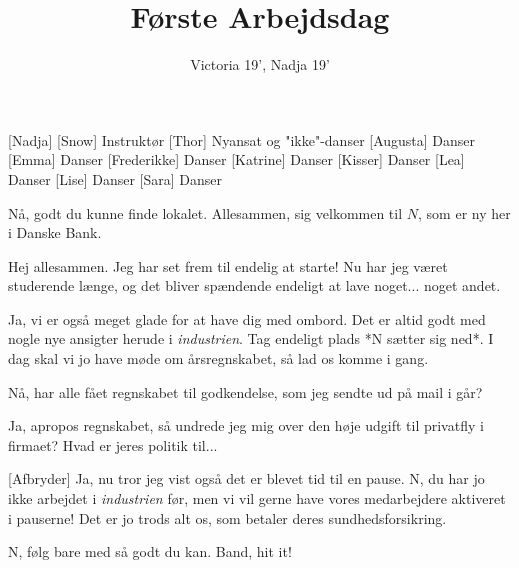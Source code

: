 \documentclass[a4paper,11pt]{article}
\title{Første Arbejdsdag}
\author{Victoria 19', Nadja 19'}
\begin{document}
\maketitle

\begin{roles}
[Nadja] 
[Snow] Instruktør
[Thor] Nyansat og "ikke"-danser
[Augusta] Danser
[Emma] Danser
[Frederikke] Danser
[Katrine] Danser
[Kisser] Danser
[Lea] Danser
[Lise] Danser
[Sara] Danser
\end{roles}



\begin{sketch}

 Nå, godt du kunne finde lokalet. Allesammen, sig velkommen til $N$, som er ny her i Danske Bank. 


 Hej allesammen. Jeg har set frem til endelig at starte! Nu har jeg været studerende længe, og det bliver spændende endeligt at lave noget... noget andet. 

 Ja, vi er også meget glade for at have dig med ombord. Det er altid godt med nogle nye ansigter herude i \emph{industrien}. Tag endeligt plads *N sætter sig ned*. I dag skal vi jo have møde om årsregnskabet, så lad os komme i gang. 


 Nå, har alle fået regnskabet til godkendelse, som jeg sendte ud på mail i går?

 Ja, apropos regnskabet, så undrede jeg mig over den høje udgift til privatfly i firmaet? Hvad er jeres politik til... 

[Afbryder] Ja, nu tror jeg vist også det er blevet tid til en pause. N, du har jo ikke arbejdet i \emph{industrien} før, men vi vil gerne have vores medarbejdere aktiveret i pauserne! Det er jo trods alt os, som betaler deres sundhedsforsikring.


 N, følg bare med så godt du kan. Band, hit it! 











\end{sketch}
\end{document}
